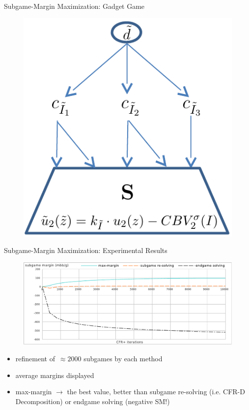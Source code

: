 \documentclass{beamer}
\theoremstyle{definition}
\begin{document}
{    \begin{frame}{Subgame-Margin Maximization: Gadget Game}
      \begin{figure}
        \centering
        \includegraphics[width=.5\textwidth]{../img/max-margin-gadget.png}
      \end{figure}

    \end{frame}

    \begin{frame}{Subgame-Margin Maximization: Experimental Results}
      \begin{figure}[H]
        \centering
        \includegraphics[width=\textwidth]{../img/sm-experiments}
      \end{figure}
      \pause

      \begin{itemize}[<+- | alert@+>]
        \item refinement of~$\approx 2000$ subgames by each method
        \item average margins displayed
        \item max-margin $\to$ the best value, better than subgame re-solving (i.e. CFR-D Decomposition) or endgame solving (negative SM!)
      \end{itemize}
    \end{frame}
  }
\end{document}
